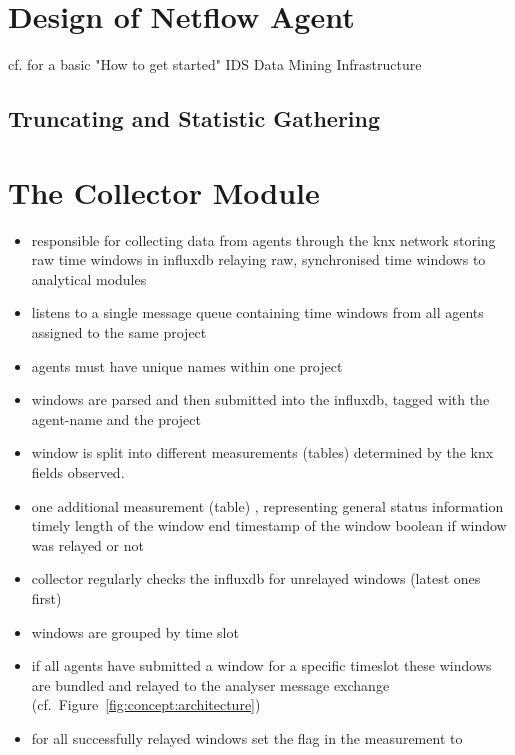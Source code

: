 \section{Design of Netflow Agent}
\label{sec:concept:agent}
cf. \textcite{Bloedorn2001} for a basic "How to get started" IDS Data Mining Infrastructure
\subsection{Truncating and Statistic Gathering}

\section{The Collector Module}
\label{sec:concept:collector}

\begin{itemize}
	\item responsible for
		\subitem collecting data from agents through the \gls{knx} network
		\subitem storing raw time windows in \gls{influxdb}
		\subitem relaying raw, synchronised time windows to analytical modules
	\item listens to a single message queue containing time windows from all agents assigned to the same project
	\item agents must have unique names within one project
	\item windows are parsed and then submitted into the \gls{influxdb}, tagged with the agent-name and the project
	\item window is split into different measurements (tables) determined by the \gls{knx} fields observed.
	\item one additional measurement (table) , representing general status information
		\subitem timely length of the window
		\subitem end timestamp of the window
		\subitem boolean if window was relayed or not
	\item collector regularly checks the \gls{influxdb} for unrelayed windows (latest ones first)
	\item windows are grouped by time slot
	\item if all agents have submitted a window for a specific timeslot these windows are bundled and relayed to the analyser message exchange (cf.~Figure~\ref{fig:concept:architecture})
	\item for all successfully relayed windows set the  flag in the  measurement to 
\end{itemize}


